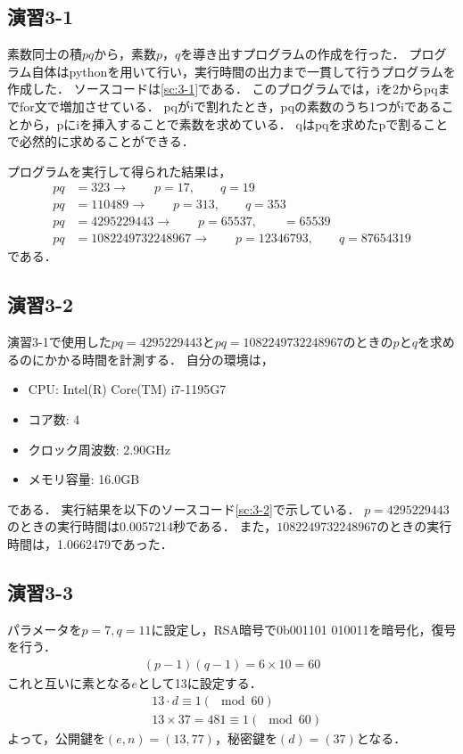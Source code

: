 \documentclass[documentclass]{jsarticle}
\begin{document}
\subsection*{演習3-1}
素数同士の積$pq$から，素数$p$，$q$を導き出すプログラムの作成を行った．
プログラム自体はpythonを用いて行い，実行時間の出力まで一貫して行うプログラムを作成した．
ソースコードは\ref*{sc:3-1}である．
このプログラムでは，iを2からpqまでfor文で増加させている．
pqがiで割れたとき，pqの素数のうち1つがiであることから，pにiを挿入することで素数を求めている．
qはpqを求めたpで割ることで必然的に求めることができる．

プログラムを実行して得られた結果は，
\begin{align*}
  pq &= 323  → \qquad p = 17, \qquad q = 19\\
  pq &= 110489 → \qquad p = 313, \qquad q = 353\\
  pq &= 4295229443 → \qquad p = 65537, \qquad = 65539\\
  pq &= 1082249732248967 → \qquad p =  12346793, \qquad q = 87654319
\end{align*}
である．





\subsection*{演習3-2}
演習3-1で使用した$pq = 4295229443$と$pq = 1082249732248967$のときの$p$と$q$を求めるのにかかる時間を計測する．
自分の環境は，
\begin{itemize}
  \item CPU: Intel(R) Core(TM) i7-1195G7
  \item コア数: 4
  \item クロック周波数: 2.90GHz
  \item メモリ容量: 16.0GB
\end{itemize}
である．
実行結果を以下のソースコード\ref*{sc:3-2}で示している．
$p=4295229443$のときの実行時間は0.0057214秒である．
また，$1082249732248967$のときの実行時間は，1.0662479であった．



\subsection*{演習3-3}
パラメータを$p=7, q=11$に設定し，RSA暗号で0b001101 010011を暗号化，復号を行う．
\begin{align}
  (p-1)(q-1) = 6 \times 10 = 60
\end{align}
これと互いに素となる$e$として13に設定する．
\begin{align}
&13 \cdot d \equiv 1(\mod60)\\
&13 \times 37 = 481 \equiv 1(\mod60)
\end{align}
よって，公開鍵を$(e,n)=(13,77)$，秘密鍵を$(d)=(37)$となる．
\end{document}
